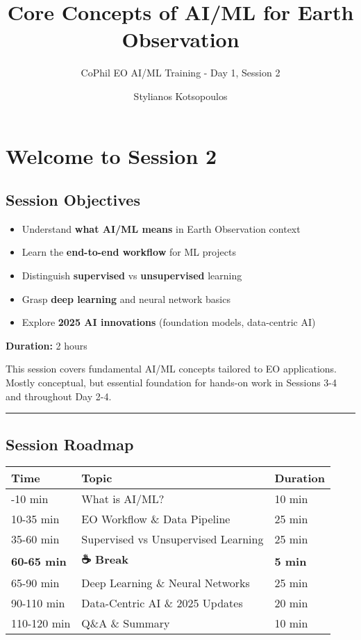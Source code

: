 \documentclass[
  letterpaper,
  DIV=11,
  numbers=noendperiod]{scrartcl}
\title{Core Concepts of AI/ML for Earth Observation}
\subtitle{CoPhil EO AI/ML Training - Day 1, Session 2}
\author{Stylianos Kotsopoulos}
\date{}
\providecommand{\tightlist}{%
  \setlength{\itemsep}{0pt}\setlength{\parskip}{0pt}}
\begin{document}
\maketitle


\section{Welcome to Session 2}\label{welcome-to-session-2}

\subsection{Session Objectives}\label{session-objectives}

\begin{itemize}
\tightlist
\item
  Understand \textbf{what AI/ML means} in Earth Observation context
\item
  Learn the \textbf{end-to-end workflow} for ML projects
\item
  Distinguish \textbf{supervised} vs \textbf{unsupervised} learning
\item
  Grasp \textbf{deep learning} and neural network basics
\item
  Explore \textbf{2025 AI innovations} (foundation models, data-centric
  AI)
\end{itemize}

\textbf{Duration:} 2 hours

This session covers fundamental AI/ML concepts tailored to EO
applications. Mostly conceptual, but essential foundation for hands-on
work in Sessions 3-4 and throughout Day 2-4.

\begin{center}\rule{0.5\linewidth}{0.5pt}\end{center}

\subsection{Session Roadmap}\label{session-roadmap}

\begin{longtable}[]{@{}lll@{}}
\toprule\noalign{}
Time & Topic & Duration \\
\midrule\noalign{}
\endhead
\bottomrule\noalign{}
\endlastfoot
00-10 min & What is AI/ML? & 10 min \\
10-35 min & EO Workflow \& Data Pipeline & 25 min \\
35-60 min & Supervised vs Unsupervised Learning & 25 min \\
\textbf{60-65 min} & \textbf{☕ Break} & \textbf{5 min} \\
65-90 min & Deep Learning \& Neural Networks & 25 min \\
90-110 min & Data-Centric AI \& 2025 Updates & 20 min \\
110-120 min & Q\&A \& Summary & 10 min \\
\end{longtable}
\end{document}
